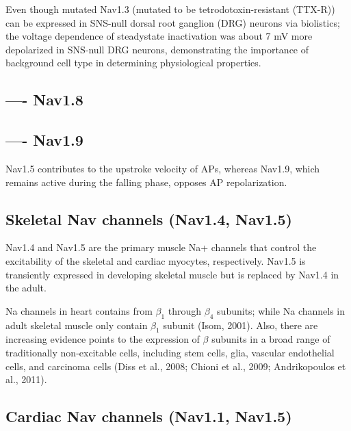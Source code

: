 Even though mutated Nav1.3 (mutated to be tetrodotoxin-resistant (TTX-R)) can be
expressed in SNS-null dorsal root ganglion (DRG) neurons via biolistics; the
voltage dependence of steadystate inactivation was about 7 mV more depolarized
in SNS-null DRG neurons, demonstrating the importance of background cell type in
determining physiological properties.

\subsection{---- Nav1.8}
\label{sec:Nav1.8}

\subsection{---- Nav1.9}
\label{sec:Nav1.9}

Nav1.5 contributes to the upstroke velocity of APs, whereas Nav1.9, which
remains active during the falling phase, opposes AP repolarization.


\subsection{Skeletal Nav channels (Nav1.4, Nav1.5)}
\label{sec:Nav1.4-skeletal}
\label{sec:Nav1.5-skeletal}
\label{sec:Nav-skeletal}

Nav1.4 and Nav1.5 are the primary muscle Na+ channels that control the
excitability of the skeletal and cardiac myocytes, respectively.
Nav1.5 is transiently expressed in developing skeletal muscle but is replaced by
Nav1.4 in the adult.

Na channels in heart contains from $\beta_1$ through $\beta_4$ subunits; while
Na channels in adult skeletal muscle only contain $\beta_1$ subunit (Isom,
2001). Also, there are increasing evidence points to the expression of $\beta$
subunits in a broad range of traditionally non-excitable cells, including stem cells,
glia, vascular endothelial cells, and carcinoma cells (Diss et al., 2008; Chioni
et al., 2009; Andrikopoulos et al., 2011).

\subsection{Cardiac Nav channels (Nav1.1, Nav1.5)}
\label{sec:Nav1.5}
\label{sec:Nav1.5-cardiac}
\label{sec:Nav-cardiac}
\label{sec:Nav1.1-cardiac}

